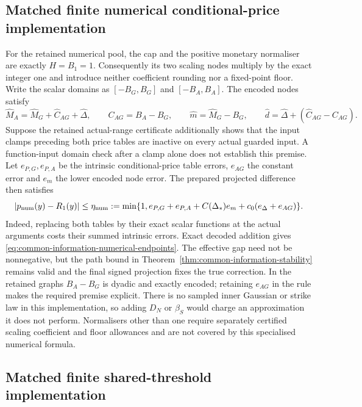 \subsection{Matched finite numerical conditional-price implementation}

For the retained numerical pool, the cap and the positive monetary
normaliser are exactly $H=B_1=1$. Consequently its two scaling nodes
multiply by the exact integer one and introduce neither coefficient
rounding nor a fixed-point floor. Write the scalar domains as
$[-B_G,B_G]$ and $[-B_A,B_A]$. The encoded nodes satisfy
\begin{equation}
 \widehat M_A=\widehat M_G+\widehat C_{AG}+\widehat\Delta,\qquad
 C_{AG}=B_A-B_G,\qquad
 \widehat m=\widehat M_G-B_G,\qquad
 \widehat d=\widehat\Delta+(\widehat C_{AG}-C_{AG}).
 \label{eq:common-information-numerical-endpoints}
\end{equation}
Suppose the retained actual-range certificate additionally shows that
the input clamps preceding both price tables are inactive on every
actual guarded input. A function-input domain check after a clamp alone
does not establish this premise. Let $e_{P,G},e_{P,A}$ be the intrinsic
conditional-price table errors, $e_{AG}$ the constant error and $e_m$
the lower encoded node error. The prepared projected difference then
satisfies
\begin{equation}
 |p_{\rm num}(y)-R_1(y)|\leq\eta_{\rm num}:=
 \min\{1,e_{P,G}+e_{P,A}+C(\Delta_*)e_m
                             +c_0(e_\Delta+e_{AG})\}.
 \label{eq:common-information-numerical-bound}
\end{equation}
Indeed, replacing both tables by their exact scalar functions at the
actual arguments costs their summed intrinsic errors. Exact decoded
addition gives \eqref{eq:common-information-numerical-endpoints}.
The effective gap need not be nonnegative, but the path bound in
Theorem~\ref{thm:common-information-stability} remains valid and the
final signed projection fixes the true correction. In the retained
graphs $B_A-B_G$ is dyadic and exactly encoded; retaining $e_{AG}$ in
the rule makes the required premise explicit. There is no sampled
inner Gaussian or strike law in this implementation, so adding $D_N$
or $\beta_S$ would charge an approximation it does not perform.
Normalisers other than one require separately certified scaling
coefficient and floor allowances and are not covered by this specialised
numerical formula.

\subsection{Matched finite shared-threshold implementation}

